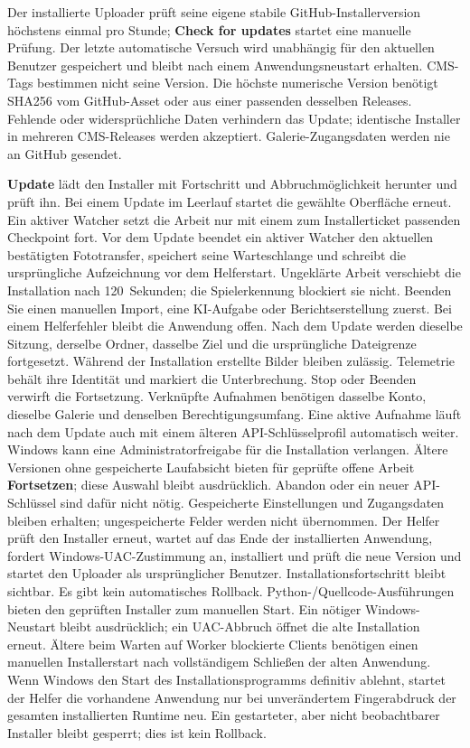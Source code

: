 \documentclass[11pt,a4paper]{article}
\newcommand{\filepath}[1]{\path{#1}}
\newcommand{\ui}[1]{\textbf{#1}}
\begin{document}
Der installierte Uploader prüft seine eigene stabile GitHub-Installerversion
höchstens einmal pro Stunde; \ui{Check for updates} startet eine manuelle
Prüfung. Der letzte automatische Versuch wird unabhängig für den aktuellen
Benutzer gespeichert und bleibt nach einem Anwendungsneustart erhalten. CMS-Tags
bestimmen nicht seine Version. Die höchste numerische Version benötigt SHA256
vom GitHub-Asset oder aus einer passenden \filepath{winapp-update.json}
desselben Releases. Fehlende oder widersprüchliche Daten verhindern das Update;
identische Installer in mehreren CMS-Releases werden akzeptiert.
Galerie-Zugangsdaten werden nie an GitHub gesendet.

\ui{Update} lädt den Installer mit Fortschritt und Abbruchmöglichkeit herunter
und prüft ihn. Bei einem Update im Leerlauf startet die gewählte Oberfläche
erneut. Ein aktiver Watcher setzt die Arbeit nur mit einem zum Installerticket
passenden Checkpoint fort. Vor dem Update beendet ein aktiver Watcher
den aktuellen bestätigten Fototransfer, speichert seine Warteschlange und
schreibt die ursprüngliche
Aufzeichnung vor dem Helferstart. Ungeklärte Arbeit verschiebt die Installation
nach 120~Sekunden; die Spielerkennung blockiert sie nicht. Beenden Sie einen
manuellen Import, eine KI-Aufgabe oder Berichtserstellung zuerst. Bei einem
Helferfehler bleibt die Anwendung offen. Nach dem Update werden dieselbe
Sitzung, derselbe Ordner, dasselbe Ziel und die ursprüngliche Dateigrenze
fortgesetzt. Während der Installation erstellte Bilder bleiben zulässig.
Telemetrie behält ihre Identität und markiert die Unterbrechung. Stop oder
Beenden verwirft die Fortsetzung. Verknüpfte Aufnahmen benötigen dasselbe
Konto, dieselbe Galerie und denselben Berechtigungsumfang. Eine aktive Aufnahme
läuft nach dem Update auch mit einem älteren API-Schlüsselprofil automatisch
weiter. Windows kann eine Administratorfreigabe für die Installation verlangen.
Ältere Versionen
ohne gespeicherte Laufabsicht bieten für geprüfte offene Arbeit
\ui{Fortsetzen}; diese Auswahl bleibt ausdrücklich. Abandon oder ein neuer
API-Schlüssel sind dafür nicht nötig. Gespeicherte Einstellungen und
Zugangsdaten bleiben erhalten; ungespeicherte Felder werden nicht übernommen.
Der Helfer prüft den
Installer erneut, wartet auf das Ende der installierten Anwendung, fordert
Windows-UAC-Zustimmung an, installiert und prüft die neue Version und startet
den Uploader als ursprünglicher Benutzer. Installationsfortschritt bleibt
sichtbar. Es gibt kein automatisches Rollback. Python-/Quellcode-Ausführungen
bieten den geprüften Installer zum manuellen Start. Ein nötiger Windows-Neustart
bleibt ausdrücklich; ein UAC-Abbruch öffnet die alte Installation erneut.
Ältere beim Warten auf Worker blockierte Clients benötigen einen manuellen
Installerstart nach vollständigem Schließen der alten Anwendung.
Wenn Windows den Start des Installationsprogramms definitiv ablehnt, startet
der Helfer die vorhandene Anwendung nur bei unverändertem Fingerabdruck der
gesamten installierten Runtime neu. Ein gestarteter, aber nicht beobachtbarer
Installer bleibt gesperrt; dies ist kein Rollback.
\end{document}
